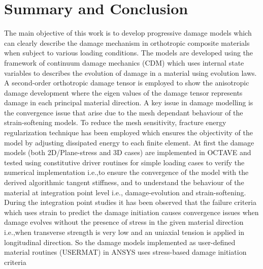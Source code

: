 \documentclass[12pt,twoside]{report}
\begin{document}
\newpage
\chapter{Summary and Conclusion}
\indent\indent\indent The main objective of this work is to develop progressive damage models which can clearly describe the  damage mechanism in orthotropic composite materials when subject to various loading conditions. The models are developed using the framework of continuum damage mechanics (CDM) which uses internal state variables to describes the evolution of damage in a material using evolution laws. A second-order orthotropic damage tensor is employed to show the anisotropic damage development where the eigen values of the damage tensor represents damage in each principal material direction. A key issue in damage modelling is the convergence issue that arise due to the mesh dependant behaviour of the strain-softening models. To reduce the mesh sensitivity, fracture energy regularization technique has been employed which ensures the objectivity of the model by adjusting dissipated energy to each finite element. At first the damage models (both 2D/Plane-stress and 3D cases) are implemented in OCTAVE and tested using constitutive driver routines for simple loading cases to verify the numerical implementation i.e.,to ensure the convergence of the model with the derived algorithmic tangent stiffness, and to understand the behaviour of the material at integration point level i.e., damage-evolution and strain-softening. During the integration point studies it has been observed that the failure criteria which uses strain to predict the damage initiation causes convergence issues when damage evolves without the presence of stress in the given material direction i.e.,when transverse strength is very low and an uniaxial tension is applied in longitudinal direction. So the damage models implemented as user-defined material routines (USERMAT) in ANSYS uses stress-based damage initiation criteria\\ 
\end{document}
